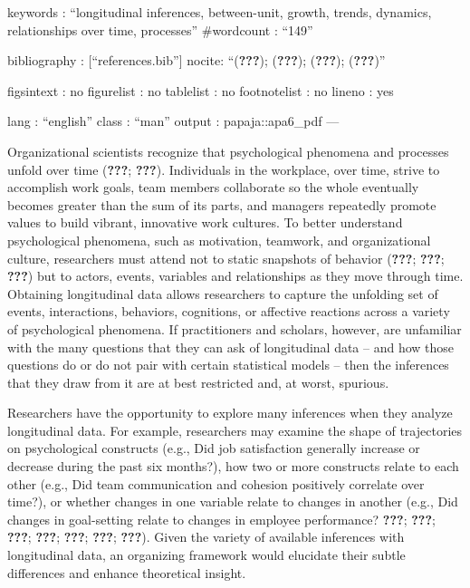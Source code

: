 \documentclass[english,,man]{apa6}
\begin{document}
keywords : \enquote{longitudinal inferences, between-unit, growth, trends, dynamics, relationships over time, processes}
\#wordcount : \enquote{149}

bibliography : {[}\enquote{references.bib}{]}
nocite: \enquote{({\textbf{???}}); ({\textbf{???}}); ({\textbf{???}}); ({\textbf{???}})}

figsintext : no
figurelist : no
tablelist : no
footnotelist : no
lineno : yes

lang : \enquote{english}
class : \enquote{man}
output : papaja::apa6\_pdf
---

Organizational scientists recognize that psychological phenomena and processes unfold over time ({\textbf{???}}; {\textbf{???}}). Individuals in the workplace, over time, strive to accomplish work goals, team members collaborate so the whole eventually becomes greater than the sum of its parts, and managers repeatedly promote values to build vibrant, innovative work cultures. To better understand psychological phenomena, such as motivation, teamwork, and organizational culture, researchers must attend not to static snapshots of behavior ({\textbf{???}}; {\textbf{???}}; {\textbf{???}}) but to actors, events, variables and relationships as they move through time. Obtaining longitudinal data allows researchers to capture the unfolding set of events, interactions, behaviors, cognitions, or affective reactions across a variety of psychological phenomena. If practitioners and scholars, however, are unfamiliar with the many questions that they can ask of longitudinal data -- and how those questions do or do not pair with certain statistical models -- then the inferences that they draw from it are at best restricted and, at worst, spurious.

Researchers have the opportunity to explore many inferences when they analyze longitudinal data. For example, researchers may examine the shape of trajectories on psychological constructs (e.g., Did job satisfaction generally increase or decrease during the past six months?), how two or more constructs relate to each other (e.g., Did team communication and cohesion positively correlate over time?), or whether changes in one variable relate to changes in another (e.g., Did changes in goal-setting relate to changes in employee performance? {\textbf{???}}; {\textbf{???}}; {\textbf{???}}; {\textbf{???}}; {\textbf{???}}; {\textbf{???}}; {\textbf{???}}). Given the variety of available inferences with longitudinal data, an organizing framework would elucidate their subtle differences and enhance theoretical insight.
\end{document}

